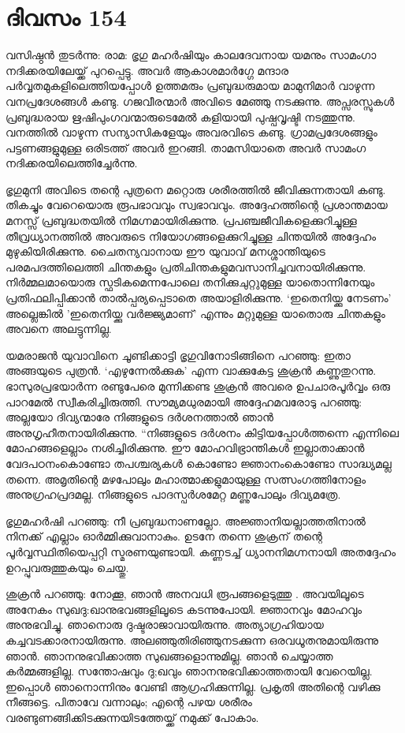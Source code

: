 \section{ദിവസം 154}


വസിഷ്ഠൻ തുടർന്നു: രാമ: ഭൃഗു മഹർഷിയും കാലദേവനായ യമനും സാമംഗാ നദിക്കരയിലേയ്ക്ക് പുറപ്പെട്ടു. അവർ ആകാശമാർഗ്ഗേ മന്ദാര പർവ്വതമുകളിലെത്തിയപ്പോൾ ഉത്തമരും പ്രബുദ്ധരുമായ മാമുനിമാർ വാഴുന്ന വനപ്രദേശങ്ങൾ കണ്ടു. ഗജവീരന്മാർ അവിടെ മേഞ്ഞു നടക്കുന്നു. അപ്സരസ്സുകൾ പ്രബുദ്ധരായ ഋഷിപുംഗവന്മാരുടെമേൽ കളിയായി പുഷ്പവൃഷ്ടി നടത്തുന്നു. വനത്തിൽ വാഴുന്ന സന്യാസികളേയും അവരവിടെ കണ്ടു. ഗ്രാമപ്രദേശങ്ങളും പട്ടണങ്ങളുമുള്ള ഒരിടത്ത് അവർ ഇറങ്ങി. താമസിയാതെ അവർ സാമംഗ നദിക്കരയിലെത്തിച്ചേർന്നു.

ഭൃഗുമുനി അവിടെ തന്റെ പുത്രനെ മറ്റൊരു ശരീരത്തില്‍ ജീവിക്കുന്നതായി കണ്ടു. തികച്ചും വേറെയൊരു രൂപഭാവവും സ്വഭാവവും. അദ്ദേഹത്തിന്റെ പ്രശാന്തമായ മനസ്സ് പ്രബുദ്ധതയിൽ നിമഗ്നമായിരിക്കുന്നു. പ്രപഞ്ചജീവികളെക്കുറിച്ചുള്ള തീവ്രധ്യാനത്തിൽ അവരുടെ നിയോഗങ്ങളെക്കുറിച്ചുള്ള ചിന്തയിൽ അദ്ദേഹം മുഴുകിയിരിക്കുന്നു. ചൈതന്യവാനായ ഈ യുവാവ് മനശ്ശാന്തിയുടെ പരമപദത്തിലെത്തി ചിന്തകളും പ്രതിചിന്തകളുമവസാനിച്ചവനായിരിക്കുന്നു. നിർമ്മലമായൊരു സ്ഫടികമെന്നപോലെ തനിക്കുചുറ്റുമുള്ള യാതൊന്നിനേയും പ്രതിഫലിപ്പിക്കാൻ താൽപ്പര്യപ്പെടാതെ അയാളിരിക്കുന്നു. ‘ഇതെനിയ്ക്കു നേടണം’ അല്ലെങ്കിൽ 'ഇതെനിയ്ക്കു വർജ്ജ്യമാണ്‌' എന്നും മറ്റുമുള്ള യാതൊരു ചിന്തകളും അവനെ അലട്ടുന്നില്ല.

യമരാജന്‍ യുവാവിനെ ചൂണ്ടിക്കാട്ടി ഭൃഗുവിനോടിങ്ങിനെ പറഞ്ഞു: ഇതാ അങ്ങയുടെ പുത്രൻ. ‘എഴുന്നേൽക്കുക’ എന്ന വാക്കുകേട്ട ശുക്രൻ കണ്ണുതുറന്നു. ഭാസുരപ്രഭയാർന്ന രണ്ടുപേരെ മുന്നിക്കണ്ട ശുക്രൻ അവരെ ഉപചാരപൂർവ്വം ഒരു പാറമേൽ സ്വീകരിച്ചിരുത്തി. സൗമ്യമധുരമായി അദ്ദേഹമവരോടു പറഞ്ഞു: അല്ലയോ ദിവ്യന്മാരേ നിങ്ങളുടെ ദർശനത്താൽ ഞാൻ അനുഗൃഹീതനായിരിക്കുന്നു. “നിങ്ങളുടെ ദർശനം കിട്ടിയപ്പോൾത്തന്നെ എന്നിലെ മോഹങ്ങളെല്ലാം നശിച്ചിരിക്കുന്നു. ഈ മോഹവിഭ്രാന്തികൾ ഇല്ലാതാക്കാൻ വേദപഠനംകൊണ്ടോ തപശ്ചര്യകൾ കൊണ്ടോ ജ്ഞാനംകൊണ്ടോ സാദ്ധ്യമല്ല തന്നെ. അമൃതിന്റെ മഴപോലും മഹാത്മാക്കളുമായുള്ള സത്സംഗത്തിനോളം അനുഗ്രഹപ്രദമല്ല. നിങ്ങളുടെ പാദസ്പർശമേറ്റ മണ്ണുപോലും ദിവ്യമത്രേ.

ഭൃഗുമഹർഷി പറഞ്ഞു: നീ പ്രബുദ്ധനാണല്ലോ. അജ്ഞാനിയല്ലാത്തതിനാൽ നിനക്ക് എല്ലാം ഓർമ്മിക്കുവാനാകും. ഉടനേ തന്നെ ശുക്രന്‌ തന്റെ പൂർവ്വസ്ഥിതിയെപ്പറ്റി സ്മരണയുണ്ടായി. കണ്ണടച്ച് ധ്യാനനിമഗ്നനായി അതദ്ദേഹം ഉറപ്പുവരുത്തുകയും ചെയ്തു.

ശുക്രൻ പറഞ്ഞു: നോക്കൂ, ഞാൻ അനവധി രൂപങ്ങളെടുത്തു . അവയിലൂടെ അനേകം സുഖദു:ഖാനുഭവങ്ങളിലൂടെ കടന്നുപോയി. ജ്ഞാനവും മോഹവും അനുഭവിച്ചു. ഞാനൊരു ദുഷ്ടരാജാവായിരുന്നു. അത്യാഗ്രഹിയായ കച്ചവടക്കാരനായിരുന്നു. അലഞ്ഞുതിരിഞ്ഞുനടക്കുന്ന ഒരവധൂതനുമായിരുന്നു ഞാന്‍. ഞാനനുഭവിക്കാത്ത സുഖങ്ങളൊന്നുമില്ല. ഞാൻ ചെയ്യാത്ത കർമ്മങ്ങളില്ല. സന്തോഷവും ദു;ഖവും ഞാനനുഭവിക്കാത്തതായി വേറെയില്ല. ഇപ്പൊൾ ഞാനൊന്നിനും വേണ്ടി ആഗ്രഹിക്കുന്നില്ല. പ്രകൃതി അതിന്റെ വഴിക്കു നീങ്ങട്ടെ. പിതാവേ വന്നാലും; എന്റെ പഴയ ശരീരം വരണ്ടുണങ്ങിക്കിടക്കുന്നയിടത്തേയ്ക്ക് നമുക്ക് പോകാം.

